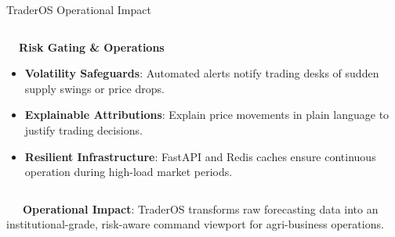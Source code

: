 \documentclass{beamer}
\begin{document}
\begin{frame}{TraderOS Operational Impact}
\begin{columns}[T]
    \begin{column}{0.48\textwidth}
        \begin{smallcard}[0.98\textwidth, top=3pt, bottom=3pt, left=4pt, right=4pt, boxsep=0.5pt]
            \centering \textbf{\textcolor{primaryDark}{\small {}~~Risk Gating \& Operations}}
            \vspace{0.08cm}
            \fontsize{6.8pt}{8.2pt}\selectfont
            \begin{itemize}\setlength\itemsep{4.5pt}\setlength\parskip{0pt}
                \item \textbf{Volatility Safeguards}: Automated alerts notify trading desks of sudden supply swings or price drops.
                \item \textbf{Explainable Attributions}: Explain price movements in plain language to justify trading decisions.
                \item \textbf{Resilient Infrastructure}: FastAPI and Redis caches ensure continuous operation during high-load market periods.
            \end{itemize}
        \end{smallcard}
    \end{column}
\end{columns}

\vspace{0.15cm}
\begin{tcolorbox}[enhanced, colback=primaryblue!4, colframe=primaryblue!30, boxrule=0.35pt,
  arc=3.5pt, width=0.98\textwidth, left=4pt, right=4pt, top=2.5pt, bottom=2.5pt, boxsep=0pt,
  halign=center, shadow={0.5pt}{-0.5pt}{0pt}{black!8}]
    \fontsize{5.5pt}{6.5pt}\selectfont
    \textcolor{primaryDark}{~~~\textbf{Operational Impact}: TraderOS transforms raw forecasting data into an institutional-grade, risk-aware command viewport for agri-business operations.}
\end{tcolorbox}
\end{frame}
\end{document}
